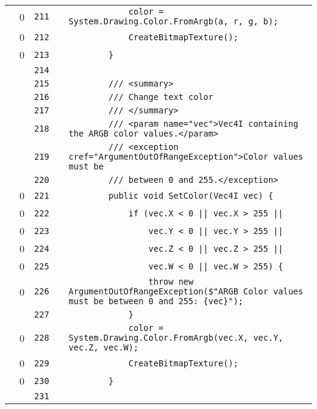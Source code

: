 \documentclass[a4paper,landscape,10pt]{article}
\begin{document}
\begin{longtable}[l]{lrrll}
\cellcolor{red} & 0 & \verb~211~ & & \verb~            color = System.Drawing.Color.FromArgb(a, r, g, b);~\\
\cellcolor{red} & 0 & \verb~212~ & & \verb~            CreateBitmapTexture();~\\
\cellcolor{red} & 0 & \verb~213~ & & \verb~        }~\\
\cellcolor{gray} &  & \verb~214~ & & \verb~~\\
\cellcolor{gray} &  & \verb~215~ & & \verb~        /// <summary>~\\
\cellcolor{gray} &  & \verb~216~ & & \verb~        /// Change text color~\\
\cellcolor{gray} &  & \verb~217~ & & \verb~        /// </summary>~\\
\cellcolor{gray} &  & \verb~218~ & & \verb~        /// <param name="vec">Vec4I containing the ARGB color values.</param>~\\
\cellcolor{gray} &  & \verb~219~ & & \verb~        /// <exception cref="ArgumentOutOfRangeException">Color values must be~\\
\cellcolor{gray} &  & \verb~220~ & & \verb~        /// between 0 and 255.</exception>~\\
\cellcolor{red} & 0 & \verb~221~ & & \verb~        public void SetColor(Vec4I vec) {~\\
\cellcolor{red} & 0 & \verb~222~ & & \verb~            if (vec.X < 0 || vec.X > 255 ||~\\
\cellcolor{red} & 0 & \verb~223~ & & \verb~                vec.Y < 0 || vec.Y > 255 ||~\\
\cellcolor{red} & 0 & \verb~224~ & & \verb~                vec.Z < 0 || vec.Z > 255 ||~\\
\cellcolor{red} & 0 & \verb~225~ & & \verb~                vec.W < 0 || vec.W > 255) {~\\
\cellcolor{red} & 0 & \verb~226~ & & \verb~                throw new ArgumentOutOfRangeException($"ARGB Color values must be between 0 and 255: {vec}");~\\
\cellcolor{gray} &  & \verb~227~ & & \verb~            }~\\
\cellcolor{red} & 0 & \verb~228~ & & \verb~            color = System.Drawing.Color.FromArgb(vec.X, vec.Y, vec.Z, vec.W);~\\
\cellcolor{red} & 0 & \verb~229~ & & \verb~            CreateBitmapTexture();~\\
\cellcolor{red} & 0 & \verb~230~ & & \verb~        }~\\
\cellcolor{gray} &  & \verb~231~ & & \verb~~\\

\end{longtable}
\end{document}
